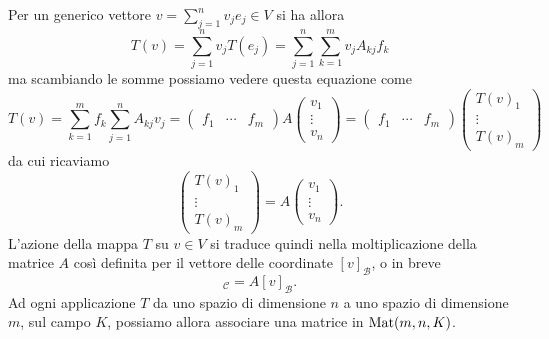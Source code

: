 Per un generico vettore $v=\sum_{j=1}^nv_je_j\in V$ si ha allora
\begin{equation}
	T(v)=\sum_{j=1}^nv_jT(e_j)=\sum_{j=1}^n\sum_{k=1}^mv_jA_{kj}f_k
\end{equation}
ma scambiando le somme possiamo vedere questa equazione come
\begin{equation}
	T(v)=\sum_{k=1}^mf_k\sum_{j=1}^nA_{kj}v_j=
	\begin{pmatrix}
		f_1&\cdots&f_m
	\end{pmatrix}
	A
	\begin{pmatrix}
		v_1\\
		\vdots\\
		v_n
	\end{pmatrix}
	=
	\begin{pmatrix}
		f_1&\cdots&f_m
	\end{pmatrix}
	\begin{pmatrix}
		T(v)_1\\
		\vdots\\
		T(v)_m
	\end{pmatrix}
\end{equation}
da cui ricaviamo
\begin{equation}
	\begin{pmatrix}
		T(v)_1\\
		\vdots\\
		T(v)_m
	\end{pmatrix}
	=A
	\begin{pmatrix}
		v_1\\
		\vdots\\
		v_n
	\end{pmatrix}.
\end{equation}
L'azione della mappa $T$ su $v\in V$ si traduce quindi nella moltiplicazione della matrice $A$ cos\`i definita per il vettore delle coordinate $[v]_{\mathcal B}$, o in breve
\begin{equation}
	[T(v)]_{\mathcal C}=A[v]_{\mathcal B}.
\end{equation}
Ad ogni applicazione $T$ da uno spazio di dimensione $n$ a uno spazio di dimensione $m$, sul campo $K$, possiamo allora associare una matrice in $\operatorname{Mat}(m,n,K)$.

